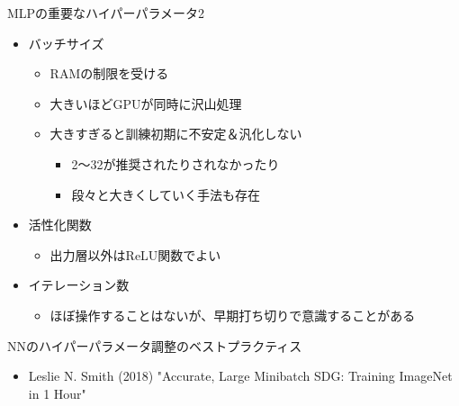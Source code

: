 \documentclass[aspectratio=169, dvipdfmx, 14pt, xcolor={svgnames,dvipsnames}]{beamer}
\def\tightlist{\itemsep1pt\parskip0pt\parsep0pt}
\begin{document}

\begin{frame}{\quad MLPの重要なハイパーパラメータ2}
  \begin{itemize}
    \item
          バッチサイズ

          \begin{itemize}
            \tightlist
            \item
                  \alert{RAMの制限を受ける}
            \item
                  \alert{大きいほどGPUが同時に沢山処理}
            \item
                  \alert{大きすぎると訓練初期に不安定＆汎化しない}

                  \begin{itemize}
                    \tightlist
                    \item
                          2～32が推奨されたりされなかったり
                    \item
                          段々と大きくしていく手法も存在
                  \end{itemize}
          \end{itemize}
    \item
          活性化関数

          \begin{itemize}
            \tightlist
            \item
                  出力層以外はReLU関数でよい
          \end{itemize}
    \item
          イテレーション数

          \begin{itemize}
            \tightlist
            \item
                  ほぼ操作することはないが、早期打ち切りで意識することがある
          \end{itemize}
  \end{itemize}
\end{frame}


\begin{frame}{\quad NNのハイパーパラメータ調整のベストプラクティス}
  \begin{itemize}
    \item Leslie N. Smith (2018) "Accurate, Large Minibatch SDG: Training ImageNet in 1 Hour"
  \end{itemize}
\end{frame}
\end{document}

